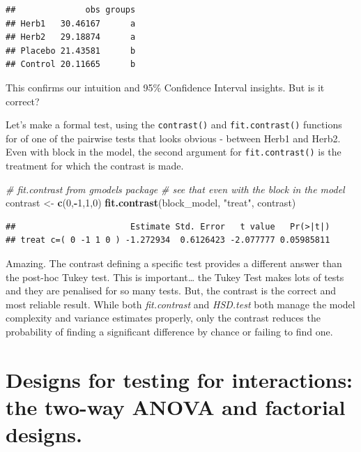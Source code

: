 \documentclass[
]{book}
\newenvironment{Shaded}{\begin{snugshade}}{\end{snugshade}}
\newcommand{\CommentTok}[1]{\textcolor[rgb]{0.56,0.35,0.01}{\textit{#1}}}
\newcommand{\DecValTok}[1]{\textcolor[rgb]{0.00,0.00,0.81}{#1}}
\newcommand{\FunctionTok}[1]{\textcolor[rgb]{0.13,0.29,0.53}{\textbf{#1}}}
\newcommand{\NormalTok}[1]{#1}
\newcommand{\OtherTok}[1]{\textcolor[rgb]{0.56,0.35,0.01}{#1}}
\newcommand{\SpecialCharTok}[1]{\textcolor[rgb]{0.81,0.36,0.00}{\textbf{#1}}}
\newcommand{\StringTok}[1]{\textcolor[rgb]{0.31,0.60,0.02}{#1}}
\begin{document}
\begin{verbatim}
##              obs groups
## Herb1   30.46167      a
## Herb2   29.18874      a
## Placebo 21.43581      b
## Control 20.11665      b
\end{verbatim}

This confirms our intuition and 95\% Confidence Interval insights. But is it correct?

Let's make a formal test, using the \texttt{contrast()} and \texttt{fit.contrast()} functions for of one of the pairwise tests that looks obvious - between Herb1 and Herb2. Even with block in the model, the second argument for \texttt{fit.contrast()} is the treatment for which the contrast is made.

\begin{Shaded}
\begin{Highlighting}[]
\CommentTok{\# fit.contrast from gmodels package}
\CommentTok{\# see that even with the block in the model}
\NormalTok{contrast }\OtherTok{\textless{}{-}} \FunctionTok{c}\NormalTok{(}\DecValTok{0}\NormalTok{,}\SpecialCharTok{{-}}\DecValTok{1}\NormalTok{,}\DecValTok{1}\NormalTok{,}\DecValTok{0}\NormalTok{)}
\FunctionTok{fit.contrast}\NormalTok{(block\_model, }\StringTok{"treat"}\NormalTok{, contrast)}
\end{Highlighting}
\end{Shaded}

\begin{verbatim}
##                       Estimate Std. Error   t value   Pr(>|t|)
## treat c=( 0 -1 1 0 ) -1.272934  0.6126423 -2.077777 0.05985811
\end{verbatim}

Amazing. The contrast defining a specific test provides a different answer than the post-hoc Tukey test. This is important\ldots{} the Tukey Test makes lots of tests and they are penalised for so many tests. But, the contrast is the correct and most reliable result. While both \emph{fit.contrast} and \emph{HSD.test} both manage the model complexity and variance estimates properly, only the contrast reduces the probability of finding a significant difference by chance or failing to find one.

\chapter{Designs for testing for interactions: the two-way ANOVA and factorial designs.}\label{designs-for-testing-for-interactions-the-two-way-anova-and-factorial-designs.}
\end{document}
